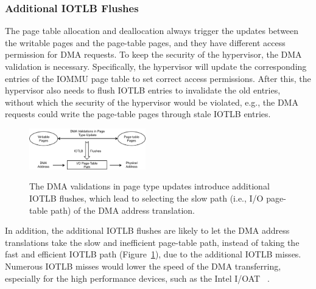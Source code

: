 \subsubsection{Additional IOTLB Flushes}
The page table allocation and deallocation always trigger the updates between the writable pages and the page-table pages, and they have different access permission for DMA requests.
To keep the security of the hypervisor, the DMA validation is necessary.
Specifically, the hypervisor will update the corresponding entries of the IOMMU page table to set correct access permissions.
After this, the hypervisor also needs to flush IOTLB entries to invalidate the old entries, without which the security of the hypervisor would be violated, e.g., the DMA requests could write the page-table pages through stale IOTLB entries.

\begin{figure}[ht]
\centering
\includegraphics[width=0.45\textwidth]{image/background/problem-illustration.png} \\
\caption{The DMA validations in page type updates introduce additional IOTLB flushes, which lead to selecting the slow path  (i.e., I/O page-table path) of the DMA address translation.}
\label{fig:pro-ill}
\end{figure}


In addition, the additional IOTLB flushes are likely to let the DMA address
translations take the slow and inefficient page-table path,
instead of taking the fast and efficient IOTLB path (Figure~\ref{fig:pro-ill}), due to the additional IOTLB misses.
Numerous IOTLB misses would lower the speed of the DMA transferring, especially for the high performance devices, such as the Intel I/OAT ~\cite{lauritzenintel}.




